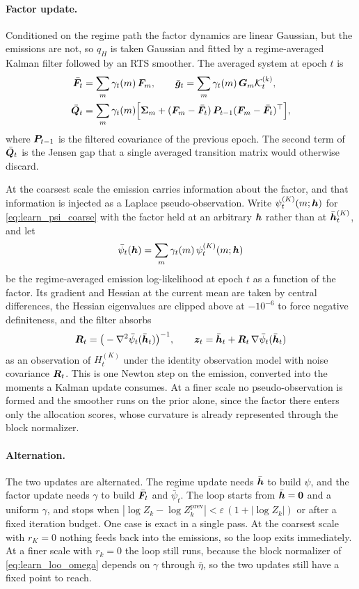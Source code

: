 \paragraph{Factor update.}
Conditioned on the regime path the factor dynamics are linear Gaussian, but the emissions are
not, so $q_H$ is taken Gaussian and fitted by a regime-averaged Kalman filter followed by an RTS
smoother. The averaged system at epoch $t$ is
\begin{align}
\bar{{\bm{F}}}_t &= \sum_{m} \gamma_t(m)\, {\bm{F}}_m,
\qquad
\bar{{\bm{g}}}_t = \sum_{m} \gamma_t(m)\, {\bm{G}}_m {\mathcal{K}}_t^{(k)},
\nonumber\\
\bar{{\bm{Q}}}_t &= \sum_{m} \gamma_t(m)\Big[{\boldsymbol{\Sigma}}_m + ({\bm{F}}_m - \bar{{\bm{F}}}_t)\, {\bm{P}}_{t-1} ({\bm{F}}_m - \bar{{\bm{F}}}_t)^\top\Big],
\label{eq:learn_avg_lgssm}
\end{align}
where ${\bm{P}}_{t-1}$ is the filtered covariance of the previous epoch. The second term of
$\bar{{\bm{Q}}}_t$ is the Jensen gap that a single averaged transition matrix would otherwise discard.

At the coarsest scale the emission carries information about the factor, and that information is
injected as a Laplace pseudo-observation. Write $\psi_t^{(K)}(m;{\bm{h}})$ for
\cref{eq:learn_psi_coarse} with the factor held at an arbitrary ${\bm{h}}$ rather than at
$\bar{{\bm{h}}}_t^{(K)}$, and let
\[
\bar{\psi}_t({\bm{h}})
=
\sum_{m} \gamma_t(m)\, \psi_t^{(K)}(m;{\bm{h}})
\]
be the regime-averaged emission log-likelihood at epoch $t$ as a function of the factor. Its
gradient and Hessian at the current mean are taken by central differences, the Hessian eigenvalues
are clipped above at $-10^{-6}$ to force negative definiteness, and the filter absorbs
\begin{align}
{\bm{R}}_t = \big(-\nabla^2 \bar{\psi}_t(\bar{{\bm{h}}}_t)\big)^{-1},
\qquad
{\bm{z}}_t = \bar{{\bm{h}}}_t + {\bm{R}}_t\, \nabla \bar{\psi}_t(\bar{{\bm{h}}}_t)
\label{eq:learn_laplace}
\end{align}
as an observation of $H_t^{(K)}$ under the identity observation model with noise covariance
${\bm{R}}_t$. This is one Newton step on the emission, converted into the moments a Kalman update
consumes. At a finer scale no pseudo-observation is formed and the smoother runs on the prior
alone, since the factor there enters only the allocation scores, whose curvature is already
represented through the block normalizer.

\paragraph{Alternation.}
The two updates are alternated. The regime update needs $\bar{{\bm{h}}}$ to build $\psi$, and the
factor update needs $\gamma$ to build $\bar{{\bm{F}}}_t$ and $\bar{\psi}_t$. The loop starts from
$\bar{{\bm{h}}} = {\bm{0}}$ and a uniform $\gamma$, and stops when
$|\log Z_k - \log Z_k^{\mathrm{prev}}| < \varepsilon\,(1 + |\log Z_k|)$ or after a fixed
iteration budget. One case is exact in a single pass. At the coarsest scale with $r_K = 0$
nothing feeds back into the emissions, so the loop exits immediately. At a finer scale with
$r_k = 0$ the loop still runs, because the block normalizer of \cref{eq:learn_loo_omega} depends
on $\gamma$ through $\bar{\eta}$, so the two updates still have a fixed point to reach.

